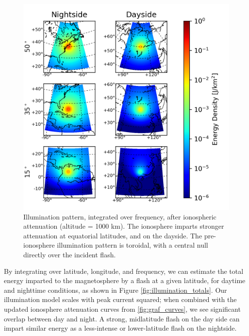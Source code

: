 \begin{figure}[h!]
\begin{center}
\includegraphics{figures/illumination_basemap.png}
\caption[Illumination pattern above the ionosphere]{Illumination pattern, integrated over frequency, after ionospheric attenuation (altitude = 1000 km). The ionosphere imparts stronger attenuation at equatorial latitudes, and on the dayside. The pre-ionosphere illumination pattern is toroidal, with a central null directly over the incident flash.}
\label{fig:illumination}
\end{center}
\end{figure}

By integrating over latitude, longitude, and frequency, we can estimate the total energy imparted to the magnetosphere by a flash at a given latitude, for daytime and nighttime conditions, as shown in Figure \ref{fig:illumination_totals}. Our illumination model scales with peak current squared; when combined with the updated ionosphere attenuation curves from \ref{fig:graf_curves}, we see significant overlap between day and night. A strong, midlatitude flash on the day side can impart similar energy as a less-intense or lower-latitude flash on the nightside.

